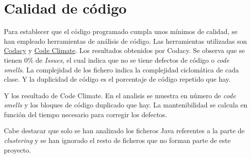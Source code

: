 \section{Calidad de código}
Para establecer que el código programado cumpla unos mínimos de calidad, se han empleado herramientas de análisis de código. Las herramientas utilizadas son \href{https://www.codacy.com/}{Codacy} y \href{https://codeclimate.com/}{Code Climate}. Los resultados obtenidos por Codacy.
Se observa que se tienen 0\% de \emph{Issues}, el cual indica que no se tiene defectos de código o \emph{code smells}. La complejidad de los fichero indica la complejidad ciclomática de cada clase. Y la duplicidad de código es el porcentaje de código repetido que hay.

Y los resultado de Code Climate.
En el analisis se muestra en número de \emph{code smells} y los bloques de código duplicado que hay. La mantenibilidad se calcula en función del tiempo necesario para corregir los defectos.


Cabe destacar que solo se han analizado los ficheros Java referentes a la parte de \emph{clustering} y se han ignorado el resto de ficheros que no forman parte de este proyecto.
